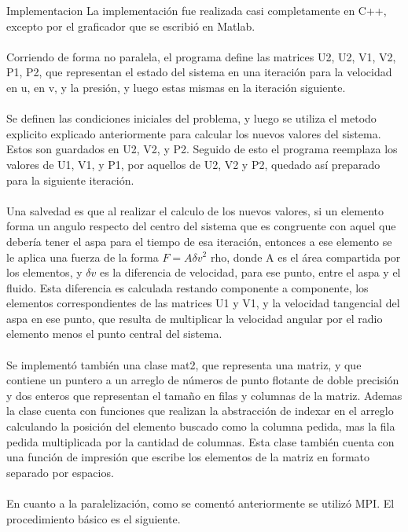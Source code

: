 
\begin{section}{Implementacion}
La implementación fue realizada casi completamente en C++, excepto por el graficador que se escribió en Matlab. 
~\\
~\\
Corriendo de forma no paralela, el programa define las matrices U2, U2, V1, V2, P1, P2, que representan el estado del sistema en una iteración para la velocidad en u, en v, y la presión, y luego estas mismas en la iteración siguiente. 
~\\
~\\
Se definen las condiciones iniciales del problema, y luego se utiliza el metodo explicito explicado anteriormente para calcular los nuevos valores del sistema. Estos son guardados en U2, V2, y P2. Seguido de esto el programa reemplaza los valores de U1, V1, y P1, por aquellos de U2, V2 y P2, quedado así preparado para la siguiente iteración. 
~\\
~\\
Una salvedad es que al realizar el calculo de los nuevos valores, si un elemento forma un angulo respecto del centro del sistema que es congruente con aquel que debería tener el aspa para el tiempo de esa iteración, entonces a ese elemento se le aplica una fuerza de la forma $F = A \delta v^2$ rho, donde A es el área compartida por los elementos, y $\delta v$ es la diferencia de velocidad, para ese punto, entre el aspa y el fluido. Esta diferencia es calculada restando componente a componente, los elementos correspondientes de las matrices U1 y V1, y la velocidad tangencial del aspa en ese punto, que resulta de multiplicar la velocidad angular por el radio elemento menos el punto central del sistema. 
~\\
~\\
Se implementó también una clase mat2, que representa una matriz, y que contiene un puntero a un arreglo de números de punto flotante de doble precisión y dos enteros que representan el tamaño en filas y columnas de la matriz. Ademas la clase cuenta con funciones que realizan la abstracción de indexar en el arreglo calculando la posición del elemento buscado como la columna pedida, mas la fila pedida multiplicada por la cantidad de columnas. Esta clase también cuenta con una función de impresión que escribe los elementos de la matriz en formato separado por espacios.
~\\
~\\
En cuanto a la paralelización, como se comentó anteriormente se utilizó MPI. El procedimiento básico es el siguiente.

\end{section}
